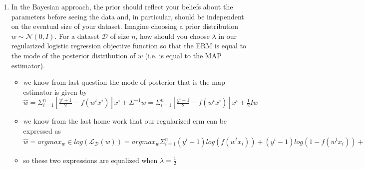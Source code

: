 \documentclass{article}
\theoremstyle{plain}
\theoremstyle{definition}
\begin{document}
\begin{enumerate}
\item In the Bayesian approach, the prior should reflect your beliefs about
the parameters before seeing the data and, in particular, should be
independent on the eventual size of your dataset. Imagine choosing a prior distribution $w\sim\mathcal{N}(0,I)$. For a dataset $\mathcal{D}$
of size $n$, how should you choose $\lambda$ in our regularized
logistic regression objective function so that the ERM is equal
to the mode of the posterior distribution of $w$ (i.e. is equal to
the MAP estimator). 
\begin{itemize}
    \color{blue}
    \item we know from last question the mode of posterior that is the map estimator is given by $\hat{w}=\Sigma_{i=1}^{n}[\frac{y^i+1}{2}-f(w^tx^i)]x^{i}+\Sigma^{-1}w=\Sigma_{i=1}^{n}[\frac{y^i+1}{2}-f(w^tx^i)]x^{i}+\frac{1}{2}Iw$
    \item we know from the last home work that our regularized erm can be expressed as  $\hat{w}=argmax_{w}\in log(\mathcal{L}_{\mathcal{D}}(w))=argmax_{w}\Sigma_{i=1}^{n}(y^i+1)log(f(w^tx_i))+(y^i-1)log(1-f(w^tx_i))+\lambda ||w||=\Sigma_{i=1}^{n}[\frac{y^i+1}{2}-f(w^tx^i)]x^{i}+\lambda w$ 
    \item so these two expressions are equalized when $\lambda=\frac{1}{2}$
\end{itemize}



\setcounter{saveenum}{\value{enumi}}
\end{enumerate}
\end{document}
